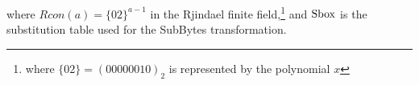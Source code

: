 where $Rcon(a) = \{02\}^{a-1}$ in the Rjindael finite field,\footnote{where $\{02\}=(00000010)_2$ is represented by the polynomial $x$} and $\mathrm{Sbox}$ is the substitution table used for the SubBytes transformation.

%


